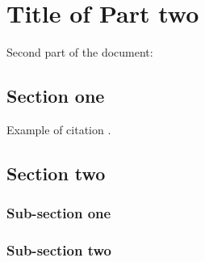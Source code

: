 


\chapter{Title of Part two}

Second part of the document:

\section{Section one}
Example of citation \cite{myRef1}.

\lipsum


\section{Section two}
\lipsum[1]

\subsection{Sub-section one}
\lipsum

\subsection{Sub-section two}
\lipsum


